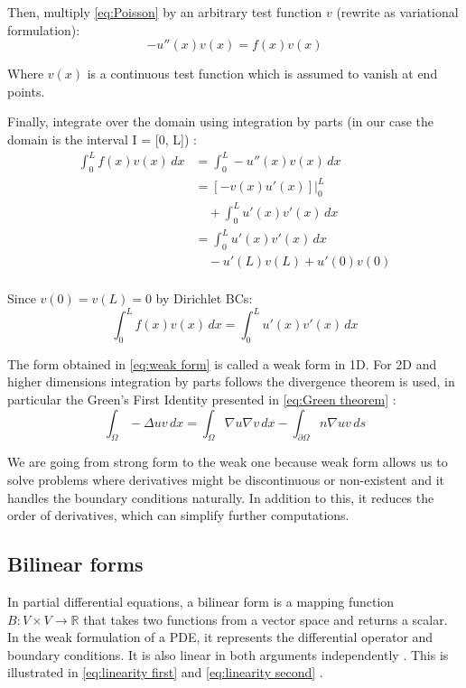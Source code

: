 \documentclass[conference]{IEEEtran}
\begin{document}
Then, multiply \ref{eq:Poisson} by an arbitrary test function $v$ (rewrite as variational formulation):
\begin{equation}
    -u''(x)v(x) = f(x)v(x)
\end{equation}

Where $v(x)$ is a continuous test function which is assumed to vanish at end points.

Finally, integrate over the domain using integration by parts (in our case the domain is the interval I = [0, L]) \cite{b10}:
\begin{equation}
\begin{aligned}     
    \int_{0}^{L}f(x) v(x) \, dx 
        &= \int_{0}^{L}-u''(x) v(x) \, dx \\ 
        &= \left[ -v(x) u'(x) \right]\Big|_{0}^{L} \\ 
        &\quad + \int_{0}^{L}u'(x) v'(x) \, dx \\ 
        &= \int_{0}^{L}u'(x) v'(x) \, dx \\ 
        &\quad - u'(L) v(L) + u'(0) v(0) \\
\end{aligned}
\end{equation}

Since $v(0) = v(L) = 0$ by Dirichlet BCs:
\begin{equation}
    \int_{0}^{L}f(x) v(x) \, dx = \int_{0}^{L}u'(x) v'(x) \, dx
    \label{eq:weak form}
\end{equation}

The form obtained in \ref{eq:weak form} is called a weak form in 1D. For 2D and higher dimensions integration by parts follows the divergence theorem is used, in particular the Green's First Identity presented in \ref{eq:Green theorem} \cite{b10}:
\begin{equation}
    \int_{\Omega}-\Delta{u}v \, dx = \int_{\Omega}\nabla{u}\nabla{v} \, dx - \int_{\partial{\Omega}} n \nabla{u}v \, ds
    \label{eq:Green theorem}
\end{equation}

We are going from strong form to the weak one because weak form allows us to solve problems where derivatives might be discontinuous or non-existent and it handles the boundary conditions naturally. In addition to this, it reduces the order of derivatives, which can simplify further computations.


\subsection{Bilinear forms}
In partial differential equations, a bilinear form is a mapping function $B: V \times V \rightarrow \mathbb{R}$ that takes two functions from a vector space and returns a scalar. 
In the weak formulation of a PDE, it represents the differential operator and boundary conditions. It is also linear in both arguments independently \cite{b6}. This is illustrated in \ref{eq:linearity first} and \ref{eq:linearity second} \cite{b6.1}.
\end{document}
